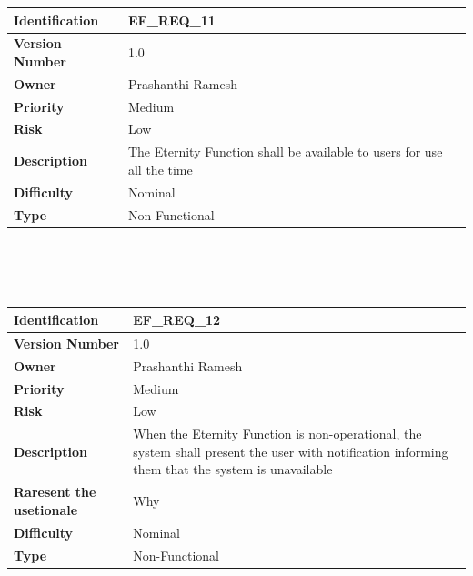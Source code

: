 \documentclass[11pt, english]{report}
\begin{document}
\setlength{\tabcolsep}{18pt}
\renewcommand{\arraystretch}{1.5}
\begin{tabular}{ |p{2.2cm}|p{9.8cm}| }
\hline
\textbf{Identification} &  EF\_REQ\_11 \\ \hline 
\textbf{Version Number} & 1.0 \\ \hline 
\textbf{Owner} & Prashanthi Ramesh  \\ \hline
\textbf{Priority} & Medium  \\ \hline
\textbf{Risk} & Low  \\ \hline
\textbf{Description} & The Eternity Function shall be available to users for use all the time\\ \hline
\textbf{Difficulty} & Nominal  \\ \hline
\textbf{Type} & Non-Functional \\ 
\hline
\end{tabular} \\ \\ \\ 

\setlength{\tabcolsep}{18pt}
\renewcommand{\arraystretch}{1.5}
\begin{tabular}{ |p{2.2cm}|p{9.8cm}| }
\hline
\textbf{Identification} &  EF\_REQ\_12 \\ \hline 
\textbf{Version Number} & 1.0 \\ \hline 
\textbf{Owner} & Prashanthi Ramesh  \\ \hline
\textbf{Priority} & Medium  \\ \hline
\textbf{Risk} & Low  \\ \hline
\textbf{Description} & When the Eternity Function is non-operational, the system shall present the user with notification informing them that the system is unavailable\\ \hline
\textbf{Raresent the usetionale} & Why  \\ \hline
\textbf{Difficulty} & Nominal  \\ \hline
\textbf{Type} & Non-Functional \\ 
\hline
\end{tabular} \\ \\ \\ 
\end{document}
